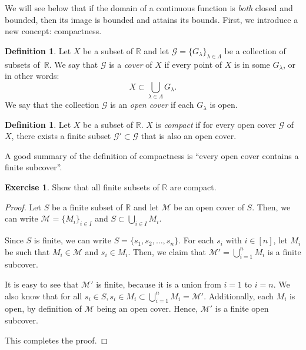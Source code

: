 \documentclass[11pt]{article}
\newcommand{\bbR}{\mathbb{R}}
\renewcommand{\_}[1]{\underline{ #1 }}
\theoremstyle{definition}
\newtheorem{definition}[theorem]{Definition}
\newtheorem{exercise}[theorem]{Exercise}
\numberwithin{equation}{subsection}
\begin{document}
We will see below that if the domain of a continuous function is {\em both} closed and bounded, then its image is bounded and attains its bounds. First, we introduce a new concept:
 compactness. 


\begin{definition}  Let $X$ be a subset of $\bbR$ and let $\mathcal{G} = \{ G_{\lambda} \}_{\lambda \in \Lambda}$ be a collection of subsets of~$\bbR$.  We say that $\mathcal{G}$ is a \emph{cover} of $X$ if every point of $X$ is in some $G_{\lambda}$, or in other words:
\[
X \subset \bigcup_{\lambda \in \Lambda} G_{\lambda}.
\]
We say that the collection $\mathcal{G}$ is an \emph{open cover} if each $G_{\lambda}$ is open.
\end{definition}

\begin{definition}  Let $X$ be a subset of $\bbR$.  $X$ is \emph{compact} if for every open cover $\mathcal{G}$ of $X$, there exists a finite subset $\mathcal{G}' \subset \mathcal{G}$ that is also an open cover.
\end{definition}

\noindent  A good summary of the definition of compactness is ``every open cover contains a finite subcover''.


\begin{exercise}
Show that all finite subsets of $\bbR$ are compact.

\begin{proof}
Let $S$ be a finite subset of $\bbR$ and let $\mathcal{M}$ be an open cover of $S$. Then, we can write $\mathcal{M}=\{M_i\}_{i\in I}$ and $S \subset \bigcup_{i \in I} M_i$. 

Since $S$ is finite, we can write $S = \{s_1, s_2, \dots, s_n\}$. For each $s_i$ with $i \in [n]$, let $M_i$ be such that $M_i \in \mathcal{M}$ and $s_i \in M_i$. Then, we claim that $\mathcal{M'}=\bigcup_{i=1}^n M_i$ is a finite subcover.

It is easy to see that $\mathcal{M'}$ is finite, because it is a union from $i=1$ to $i=n$. We also know that for all $s_i \in S, s_i \in M_i \subset \bigcup_{i=1}^n M_i = \mathcal{M'}$. Additionally, each $M_i$ is open, by definition of $\mathcal{M}$ being an open cover. Hence, $\mathcal{M'}$ is a finite open subcover. 

This completes the proof.


\renewcommand\qedsymbol{QED}
\end{proof}



\end{exercise} 
\end{document}
